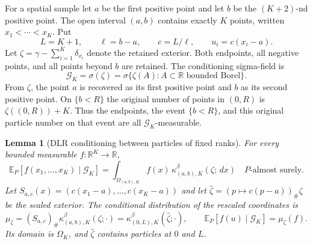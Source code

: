 \documentclass[11pt,reqno]{amsart}
\numberwithin{equation}{section}
\newtheorem{lemma}[theorem]{Lemma}
\theoremstyle{definition}
\theoremstyle{remark}
\newcommand{\R}{\mathbb R}
\newcommand{\E}{\mathbb E}
\newcommand{\1}{\mathbf 1}
\newcommand{\dd}{\,d}
\newcommand{\calG}{\mathcal G}
\begin{document}
For a spatial sample let $a$ be the first positive point and let $b$ be
the $(K+2)$-nd positive point. The open interval $(a,b)$ contains exactly
$K$ points, written $x_1<\cdots<x_K$. Put
\[
L=K+1,\qquad \ell=b-a,\qquad c=L/\ell,\qquad
u_i=c(x_i-a).
\]
Let $\zeta=\gamma-\sum_{i=1}^K\delta_{x_i}$ denote the retained exterior.
Both endpoints, all negative points, and all points beyond $b$ are
retained. The conditioning sigma-field is
\[
\calG_K=\sigma(\zeta)
=\sigma\{\zeta(A):A\subset\R\text{ bounded Borel}\}.
\]
From $\zeta$, the point $a$ is recovered as its first positive point and
$b$ as its second positive point. On $\{b<R\}$ the original number of
points in $(0,R)$ is $\zeta((0,R))+K$. Thus the endpoints, the event
$\{b<R\}$, and this original particle number on that event are all
$\calG_K$-measurable.

\begin{samepage}
\begin{lemma}[DLR conditioning between particles of fixed ranks]\label{lem:random-dlr}
For every bounded measurable $f:\R^K\to\R$,
\begin{equation}\label{eq:random-dlr-law}
\E_P[f(x_1,\ldots,x_K)\mid\calG_K]
 =\int_{\Omega_{(a,b),K}}f(x)\,
        \kappa_{(a,b),K}^\beta(\zeta;\dd x)
 \quad P\text{-almost surely}.
\end{equation}
Let $S_{a,c}(x)=(c(x_1-a),\ldots,c(x_K-a))$ and let
$\widehat\zeta=(p\mapsto c(p-a))_\#\zeta$ be the scaled exterior.
The conditional distribution of the rescaled coordinates is
\begin{equation}\label{eq:rescaled-conditional-law}
\mu_\zeta=(S_{a,c})_\#\kappa_{(a,b),K}^\beta(\zeta;\cdot)
       =\kappa_{(0,L),K}^\beta(\widehat\zeta;\cdot),
\qquad
\E_P[f(u)\mid\calG_K]=\mu_\zeta(f).
\end{equation}
Its domain is $\Omega_K$, and $\widehat\zeta$ contains particles at
$0$ and $L$.
\end{lemma}
\end{samepage}
\end{document}
